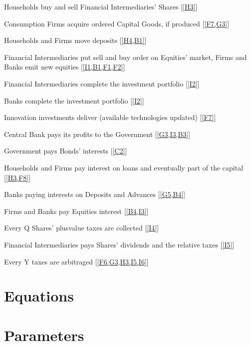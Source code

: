 \documentclass[a4paper, headings=standardclasses]{scrartcl}
\begin{document}
\begin{steps}
	\item \label{H4} Households buy and sell Financial Intermediaries' Shares [\cref{H3}]
	\item \label{F8} Consumption Firms acquire ordered Capital Goods, if produced [\cref{F7,G3}]
	\item \label{B2} Households and Firms move deposits [\cref{H4,B1}]
	\item \label{I2} Financial Intermediaries put sell and buy order on Equities' market, Firms and Banks emit new equities [\cref{I1,B1,F1,F2}]
	\item \label{I3} Financial Intermediaries complete the investment portfolio [\cref{I2}]
	\item \label{B3} Banks complete the investment portfolio [\cref{I2}]
	\item \label{F9} Innovation investments deliver (available technologies updated) [\cref{F7}]
	\item \label{C2} Central Bank pays its profits to the Government [\cref{G3,I3,B3}]
	\item \label{G5} Government pays Bonds' interests [\cref{C2}]
	\item \label{B4} Households and Firms pay interest on loans and eventually part of the capital [\cref{H3,F8}]
	\item \label{B5} Banks paying interests on Deposits and Advances [\cref{G5,B4}]
	\item \label{I4} Firms and Banks pay Equities interest [\cref{B4,I3}]
	\item \label{I5} Every Q Shares' plusvalue taxes are collected [\cref{I4}]
	\item \label{I6} Financial Intermediaries pays Shares' dividends and the relative taxes [\cref{I5}]
	\item \label{G6} Every Y taxes are arbitraged [\cref{F6,G3,H3,I5,I6}]


\end{steps}

\section{Equations}

\section{Parameters}

\printbibliography
\end{document}
